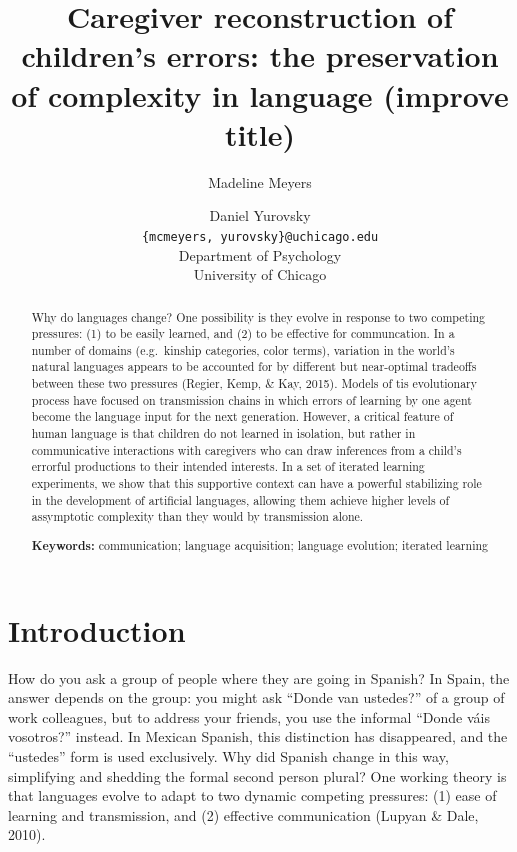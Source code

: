 \documentclass[10pt, letterpaper]{article}
\title{Caregiver reconstruction of children's errors: the preservation of
complexity in language (improve title)}
\author{Madeline Meyers \and Daniel Yurovsky \\
        \texttt{\{mcmeyers, yurovsky\}@uchicago.edu} \\
       Department of Psychology \\ University of Chicago}
\begin{document}
\maketitle

\begin{abstract}
Why do languages change? One possibility is they evolve in response to
two competing pressures: (1) to be easily learned, and (2) to be
effective for communcation. In a number of domains (e.g.~kinship
categories, color terms), variation in the world's natural languages
appears to be accounted for by different but near-optimal tradeoffs
between these two pressures (Regier, Kemp, \& Kay, 2015). Models of tis
evolutionary process have focused on transmission chains in which errors
of learning by one agent become the language input for the next
generation. However, a critical feature of human language is that
children do not learned in isolation, but rather in communicative
interactions with caregivers who can draw inferences from a child's
errorful productions to their intended interests. In a set of iterated
learning experiments, we show that this supportive context can have a
powerful stabilizing role in the development of artificial languages,
allowing them achieve higher levels of assymptotic complexity than they
would by transmission alone.

\textbf{Keywords:}
communication; language acquisition; language evolution; iterated
learning
\end{abstract}

\hypertarget{introduction}{%
\section{Introduction}\label{introduction}}

How do you ask a group of people where they are going in Spanish? In
Spain, the answer depends on the group: you might ask ``Donde van
ustedes?'' of a group of work colleagues, but to address your friends,
you use the informal ``Donde váis vosotros?'' instead. In Mexican
Spanish, this distinction has disappeared, and the ``ustedes'' form is
used exclusively. Why did Spanish change in this way, simplifying and
shedding the formal second person plural? One working theory is that
languages evolve to adapt to two dynamic competing pressures: (1) ease
of learning and transmission, and (2) effective communication (Lupyan \&
Dale, 2010).
\end{document}
